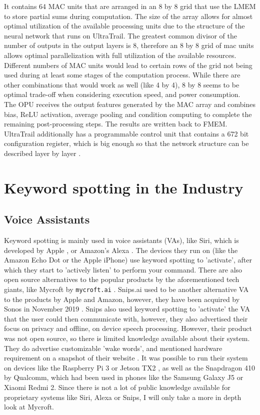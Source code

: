 It contains 64 MAC units that are arranged in an 8 by 8 grid that use the LMEM to store partial sums during computation.
The size of the array allows for almost optimal utilization of the available processing units due to the structure of the
neural network that runs on UltraTrail.
The greatest common divisor of the number of outputs in the output layers is 8, therefore an 8 by 8 grid of mac units
allows optimal parallelization with full utilization of the available resources.
Different numbers of MAC units would lead to certain rows of the grid not being used during at least some stages of the
computation process.
While there are other combinations that would work as well (like 4 by 4), 8 by 8 seems to be optimal trade-off when
considering execution speed, and power consumption.
\\
The OPU receives the output features generated by the MAC array and combines bias, ReLU activation,
average pooling and condition computing to complete the remaining post-processing steps.
The results are written back to FMEM.
\\
UltraTrail additionally has a programmable control unit that contains a 672 bit
configuration register, which is big enough so that the network structure
can be described layer by layer \cite[Ch IV]{ultratrail}.

\newpage
\section{Keyword spotting in the Industry}

\subsection{Voice Assistants}

Keyword spotting is mainly used in voice assistants (VAs), like Siri, which is developed by Apple \cite{siri}, or Amazon's Alexa \cite{alexa}.
The devices they run on (like the Amazon Echo Dot or the Apple iPhone) use keyword spotting to 'activate', after which they start
to 'actively listen' to perform your command.
There are also open source alternatives to the popular products by the aforementioned tech giants, like Mycroft by \lstinline{mycroft.ai} \cite{mycroft}.
Snips.ai used to be another alternative VA to the products by Apple and Amazon, however, they have been acquired by Sonos in November 2019 \cite{sonos_snips}.
Snips also used keyword spotting to 'activate' the VA that the user could then communicate with, however, they also advertised their focus
on privacy and offline, on device speech processing.
However, their product was not open source, so there is limited knowledge available about their system.
They do advertise customizable 'wake words', and mentioned hardware requirement on a snapshot of their website \cite{snips_flow}.
It was possible to run their system on devices like the Raspberry Pi 3 \cite{rpi3} or Jetson TX2 \cite{jetson_tx2},
as well as the Snapdragon 410 \cite{snapdragon_410} by Qualcomm, which had been used in phones like the Samsung Galaxy J5 or Xiaomi Redmi 2.
Since there is not a lot of public knowledge available for proprietary systems like Siri, Alexa or Snips, I will only take a more in depth look at Mycroft.

